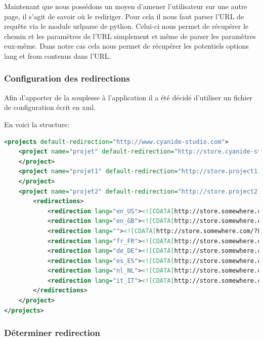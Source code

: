 Maintenant que nous possédons un moyen d'amener l'utilisateur sur une autre page, il s'agit de savoir où le rediriger. Pour cela il nous faut parser l'URL de requête via le module urlparse de python. Celui-ci nous permet de récupérer le chemin et les paramètres de l'URL simplement et même de parser les paramètres eux-même. Dans notre cas cela nous permet de récupérer les potentiels 
options lang et from contenus dans l'URL.

\subsubsection*{Configuration des redirections}
Afin d'apporter de la souplesse à l'application il a été décidé d'utiliser un fichier de configuration écrit en xml.

En voici la structure:


\begin{lstlisting}[language=XML]
<projects default-redirection="http://www.cyanide-studio.com">
    <project name="projet" default-redirection="http://store.cyanide-studio.com/project2" disable="1">
    </project>
    <project name="projet1" default-redirection="http://store.project1.com">
    </project>
    <project name="projet2" default-redirection="http://store.project2.com">
        <redirections>
            <redirection lang="en_US"><![CDATA[http://store.somewhere.com/?typnews=]]></redirection>
            <redirection lang="en_GB"><![CDATA[http://store.somewhere.com/?typnews=]]></redirection>
            <redirection lang=""><![CDATA[http://store.somewhere.com/?Langue=en_GB&typnews=]]></redirection>
            <redirection lang="fr_FR"><![CDATA[http://store.somewhere.com/?Langue=fr_FR&typnews=]]></redirection>
            <redirection lang="de_DE"><![CDATA[http://store.somewhere.com/?Langue=de_DE&typnews=]]></redirection>
            <redirection lang="es_ES"><![CDATA[http://store.somewhere.com/?Langue=es_ES&typnews=]]></redirection>
            <redirection lang="nl_NL"><![CDATA[http://store.somewhere.com/?Langue=nl_NL&typnews=]]></redirection>
            <redirection lang="it_IT"><![CDATA[http://store.somewhere.com/?Langue=it_IT&typnews=]]></redirection>
        </redirections>
    </project>
</projects>
\end{lstlisting}

\subsubsection*{Déterminer redirection}

